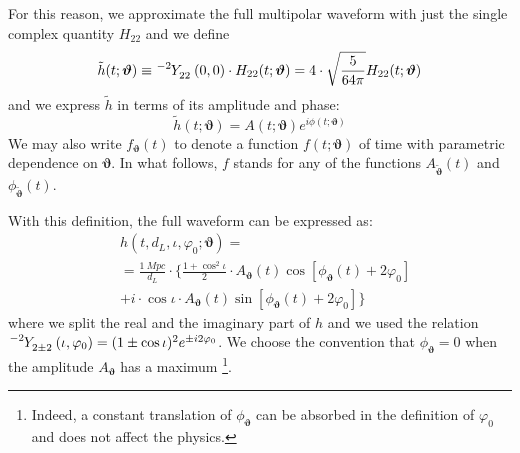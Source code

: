 For this reason, we approximate the full multipolar waveform with just the single complex quantity $H_{22}$ and we define
\begin{equation}\label{eq:h_std}
	\tilde{h}(t; \boldsymbol{\vartheta}) \equiv \tensor[^{-2}]{Y}{_{2 2}}(0,0) \cdot H_{22}(t; \boldsymbol{\vartheta}) = 4\cdot\sqrt{\frac{5}{64\pi}}H_{22}(t; \boldsymbol{\vartheta})
\end{equation}
and we express $\tilde{h}$ in terms of its amplitude and phase:
\begin{equation}\label{eq:h_ML}
	\tilde{h}(t; \boldsymbol{\vartheta}) = A(t; \boldsymbol{\vartheta}) e^{i \phi(t; \boldsymbol{\vartheta})} 
\end{equation}
We may also write $f_{\boldsymbol{\vartheta}}(t)$ to denote a function $f(t;\boldsymbol{\vartheta})$ of time with parametric dependence on $\boldsymbol{\vartheta}$.
In what follows, $f$ stands for any of the functions $A_{\tilde{\boldsymbol{\vartheta}}}(t)$ and ${\phi}_{\tilde{\boldsymbol{\vartheta}}}(t)$.
\par
With this definition, the full waveform can be expressed as:
\begin{align} 
	&h(t, d_L,\iota,\varphi_0; \boldsymbol{\vartheta}) =  \nonumber\\
		&= {\frac{\SI{1}{Mpc}}{d_L}} \cdot \Bigg\{ \frac{1+\cos^2\iota}{2} \cdot A_{\boldsymbol{\vartheta}}(t)  \cos[\phi_{\boldsymbol{\vartheta}}(t)+2\varphi_0]  \nonumber \\
		&+ i \cdot \cos\iota \cdot A_{\boldsymbol{\vartheta}}(t) \sin[\phi_{\boldsymbol{\vartheta}}(t)+2\varphi_0] \Bigg\}
\label{eq:h_parametrization_simple}
\end{align}
where we split the real and the imaginary part of $h$ and we used the relation ${\tensor[^{-2}]{Y}{_{2 \pm 2}}(\iota, \varphi_0) = (1 \pm \cos \iota)^2 e^{\pm i 2 \varphi_0}}$.
We choose the convention that $\phi_{\boldsymbol{\vartheta}} = 0$ when the amplitude $A_{\boldsymbol{\vartheta}}$ has a maximum
\footnote{Indeed, a constant translation of $\phi_{\boldsymbol{\vartheta}}$ can be absorbed in the definition of $\varphi_0$ and does not affect the physics.}.
\par
{}

